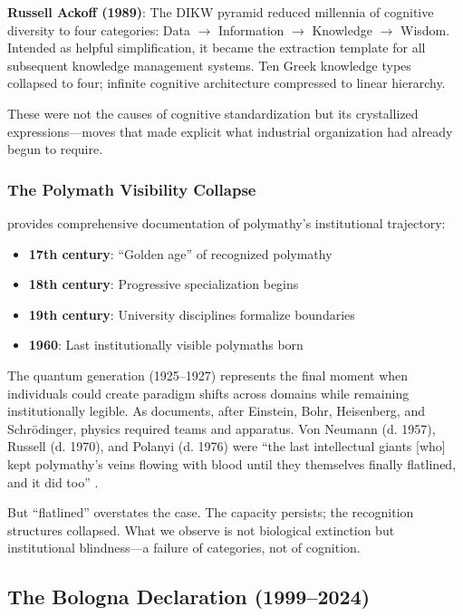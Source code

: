 \textbf{Russell Ackoff (1989)}: The DIKW pyramid \citep{ackoff1989} reduced millennia of cognitive diversity to four categories: Data $\rightarrow$ Information $\rightarrow$ Knowledge $\rightarrow$ Wisdom. Intended as helpful simplification, it became the extraction template for all subsequent knowledge management systems. Ten Greek knowledge types collapsed to four; infinite cognitive architecture compressed to linear hierarchy.

These were not the causes of cognitive standardization but its crystallized expressions---moves that made explicit what industrial organization had already begun to require.

\subsubsection{The Polymath Visibility Collapse}

\citet{burke2020} provides comprehensive documentation of polymathy's institutional trajectory:

\begin{itemize}
    \item \textbf{17th century}: ``Golden age'' of recognized polymathy
    \item \textbf{18th century}: Progressive specialization begins
    \item \textbf{19th century}: University disciplines formalize boundaries
    \item \textbf{1960}: Last institutionally visible polymaths born
\end{itemize}

The quantum generation (1925--1927) represents the final moment when individuals could create paradigm shifts across domains while remaining institutionally legible. As \citet{beller1996} documents, after Einstein, Bohr, Heisenberg, and Schrödinger, physics required teams and apparatus. Von Neumann (d. 1957), Russell (d. 1970), and Polanyi (d. 1976) were ``the last intellectual giants [who] kept polymathy's veins flowing with blood until they themselves finally flatlined, and it did too'' \citep{hoel2025}.

But ``flatlined'' overstates the case. The capacity persists; the recognition structures collapsed. What we observe is not biological extinction but institutional blindness---a failure of categories, not of cognition.

\subsection{The Bologna Declaration (1999--2024)}

